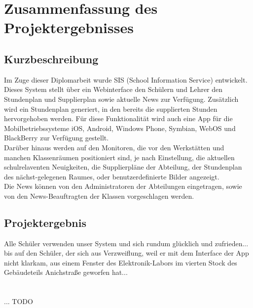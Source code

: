\chapter[Zusammenfassung]{Zusammenfassung des Projektergebnisses}

\section{Kurzbeschreibung}
Im Zuge dieser Diplomarbeit wurde SIS (School Information Service) entwickelt. \\
Dieses System stellt über ein Webinterface den Schülern und Lehrer den Stundenplan und Supplierplan sowie aktuelle News zur Verfügung. Zusätzlich wird ein Stundenplan generiert, in den bereits die supplierten Stunden hervorgehoben werden.
Für diese Funktionalität wird auch eine App für die Mobilbetriebssysteme iOS, Android, Windows Phone, Symbian, WebOS und BlackBerry zur Verfügung gestellt.\\
Darüber hinaus werden auf den Monitoren, die vor den Werkstätten und manchen Klassenräumen positioniert sind, je nach Einstellung, die aktuellen schulrelaventen Neuigkeiten, die Supplierpläne der Abteilung, der Stundenplan des nächst-gelegenen Raumes, oder benutzerdefinierte Bilder angezeigt.\\
Die News können von den Administratoren der Abteilungen eingetragen, sowie von den News-Beauftragten der Klassen vorgeschlagen werden.


\section{Projektergebnis}
Alle Schüler verwenden unser System und sich rundum glücklich und zufrieden... bis auf den Schüler, der sich aus Verzweiflung, weil er mit dem Interface der App nicht klarkam, aus einem Fenster des Elektronik-Labors im vierten Stock des Gebäudeteils Anichstraße geworfen hat...\\
\\
\\... TODO